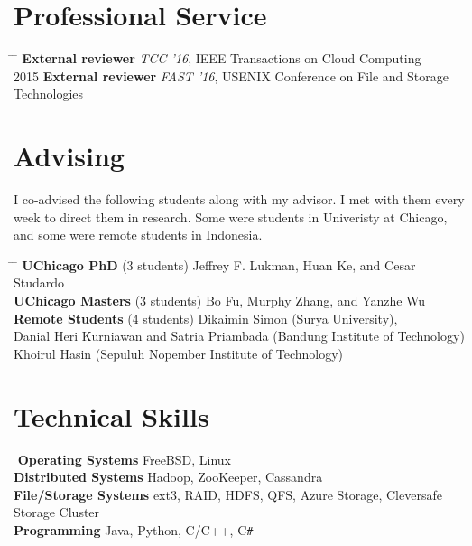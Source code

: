 \documentclass[10pt]{article} %
\begin{document}
\section{Professional Service}

\begin{tabbing}
\hspace{2.5cm} \= \hspace{3.5cm}  \=  \> \textbf{External reviewer} \> \textit{TCC '16}, IEEE Transactions on Cloud Computing \\
2015 \> \textbf{External reviewer} \> \textit{FAST '16}, USENIX Conference on File and Storage Technologies
\end{tabbing}


\section{Advising}

I co-advised the following students along with my advisor. I met with them
every week to direct them in research. Some were students in Univeristy at
Chicago, and some were remote students in Indonesia.
\begin{tabbing}
\hspace{3.5cm} \= \hspace{2.5cm} \= \kill
\textbf{UChicago PhD} \> (3 students) \> Jeffrey F. Lukman, Huan Ke, and Cesar Studardo\\
\textbf{UChicago Masters} \> (3 students) \> Bo Fu, Murphy Zhang, and Yanzhe Wu\\
\textbf{Remote Students} \> (4 students) \> Dikaimin Simon (Surya University),\\
\> \>Danial Heri Kurniawan and Satria Priambada (Bandung Institute of Technology)\\
\> \>Khoirul Hasin (Sepuluh Nopember Institute of Technology)
\end{tabbing}


\section{Technical Skills}

\begin{tabbing}
\hspace{4cm} \= \kill
\textbf{Operating Systems} \> FreeBSD, Linux \\
\textbf{Distributed Systems} \> Hadoop, ZooKeeper, Cassandra \\
\textbf{File/Storage Systems} \> ext3, RAID, HDFS, QFS, Azure Storage, Cleversafe Storage Cluster\\
\textbf{Programming} \> Java, Python, C/C++, C\texttt{\#}
\end{tabbing}
\end{document}
